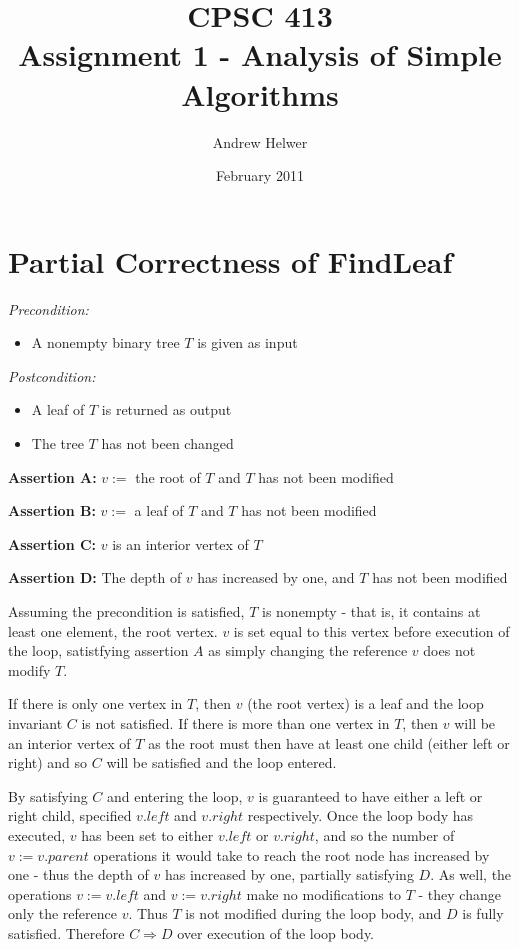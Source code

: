 \documentclass{article}
\begin{document}
\title{CPSC 413 \\ Assignment 1 - Analysis of Simple Algorithms}
\author{Andrew Helwer}
\date{February 2011}
\maketitle

\section{Partial Correctness of FindLeaf}

\emph{Precondition:}	
\begin{itemize}
\item A nonempty binary tree $T$ is given as input
\end{itemize}

\emph{Postcondition:}
\begin{itemize} \item A leaf of $T$ is returned as output 
\item The tree $T$ has not been changed 
\end{itemize}

\textbf{Assertion A:} $v:=$ the root of $T$ and $T$ has not been modified

\textbf{Assertion B:} $v:=$ a leaf of $T$ and $T$ has not been modified

\textbf{Assertion C:} $v$ is an interior vertex of $T$

\textbf{Assertion D:} The depth of $v$ has increased by one, and $T$ has not
been modified

Assuming the precondition is satisfied, $T$ is nonempty - that is, it contains
at least one element, the root vertex. $v$ is set equal to this vertex before
execution of the loop, satistfying assertion $A$ as simply changing the
reference $v$ does not modify $T$.

If there is only one vertex in $T$, then $v$ (the root vertex) is a leaf and
the loop invariant $C$ is not satisfied. If there is more than one vertex in
$T$, then $v$ will be an interior vertex of $T$ as the root must then have at
least one child (either left or right) and so $C$ will be satisfied and the
loop entered.

By satisfying $C$ and entering the loop, $v$ is guaranteed to have either a
left or right child, specified $v.left$ and $v.right$ respectively. Once the
loop body has executed, $v$ has been set to either $v.left$ or $v.right$, and so
the number of $v:=v.parent$ operations it would take to reach the root node has
increased by one - thus the depth of $v$ has increased by one, partially
satisfying $D$. As well, the operations $v:=v.left$ and $v:=v.right$ make no
modifications to $T$ - they change only the reference $v$. Thus $T$ is not
modified during the loop body, and $D$ is fully satisfied. Therefore $C
\Rightarrow D$ over execution of the loop body.
\end{document}
